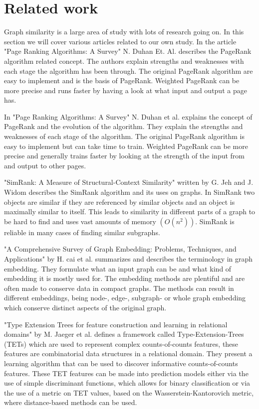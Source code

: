 \section{Related work}
\label{sec:Related_work}
Graph similarity is a large area of study with lots of research going on. In this section we will cover various articles related to our own study.
In the article "Page Ranking Algorithms: A Survey" N. Duhan Et. Al.\cite{4809246} describes the PageRank algorithm related concept. The authors explain strengths and weaknesses with each stage the algorithm has been through. The original PageRank algorithm are easy to implement and is the basis of PageRank. Weighted PageRank can be more precise and runs faster by having a look at what input and output a page has.

In "Page Ranking Algorithms: A Survey" N. Duhan et al.\cite{4809246} explains the concept of PageRank and the evolution of the algorithm. They explain the strengths and weaknesses of each stage of the algorithm. The original PageRank algorithm is easy to implement but can take time to train. Weighted PageRank can be more precise and generally trains faster by looking at the strength of the input from and output to other pages. 

"SimRank: A Measure of Structural-Context Similarity" written by G. Jeh and J. Widom\cite{10.1145/775047.775126} describes the SimRank algorithm and its uses on graphs. In SimRank two objects are similar if they are referenced by similar objects and an object is maximally similar to itself. This leads to similarity in different parts of a graph to be hard to find and uses vast amounts of memory $(O(n^2))$. SimRank is reliable in many cases of finding similar subgraphs.

"A Comprehensive Survey of Graph Embedding: Problems, Techniques, and Applications" by H. cai et al.\cite{8294302} summarizes and describes the terminology in graph embedding. They formulate what an input graph can be and what kind of embedding it is mostly used for. The embedding methods are plentiful and are often made to conserve data in compact graphs. The methods can result in different embeddings, being node-, edge-, subgraph- or whole graph embedding which conserve distinct aspects of the original graph.

"Type Extension Trees for feature construction and learning in relational domains" by M. Jaeger et al. \cite{JAEGER201330} defines a framework called Type-Extension-Trees (TETs) which are used to represent complex counts-of-counts features, these features are combinatorial data structures in a relational domain. They present a learning algorithm that can be used to discover informative counts-of-counts features. These TET features can be made into prediction models either via the use of simple discriminant functions, which allows for binary classification or via the use of a metric on TET values, based on the Wasserstein-Kantorovich metric, where distance-based methods can be used.

